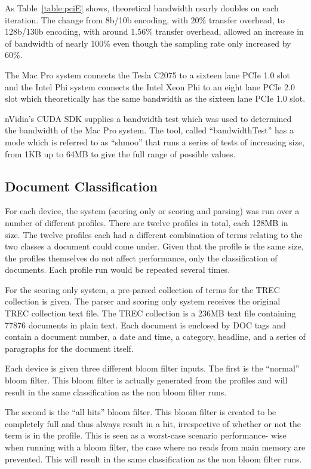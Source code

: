 As Table~\ref{table:pciE} shows, theoretical bandwidth nearly doubles on each
iteration. The change from 8b/10b encoding, with 20\% transfer overhead, to
128b/130b encoding, with around 1.56\% transfer overhead, allowed an increase in
of bandwidth of nearly 100\% even though the sampling rate only increased by
60\%.

The Mac Pro system connects the Tesla C2075 to a sixteen lane PCIe 1.0 slot and
the Intel Phi system connects the Intel Xeon Phi to an eight lane PCIe 2.0 slot
which theoretically has the same bandwidth as the sixteen lane PCIe 1.0 slot.

nVidia's CUDA SDK supplies a bandwidth test which was used to determined the
bandwidth of the Mac Pro system. The tool, called ``bandwidthTest'' has a mode
which is referred to as ``shmoo'' that runs a series of tests of increasing
size, from 1KB up to 64MB to give the full range of possible values.

\subsection{Document Classification}

For each device, the system (scoring only or scoring and parsing) was run over a
number of different profiles. There are twelve profiles in total, each 128MB in
size. The twelve profiles each had a different combination of terms relating to
the two classes a document could come under. Given that the profile is the same
size, the profiles themselves do not affect performance, only the classification
of documents. Each profile run would be repeated several times.

For the scoring only system, a pre-parsed collection of terms for the TREC
collection is given. The parser and scoring only system receives the original
TREC collection text file. The TREC collection is a 236MB text file containing
77876 documents in plain text. Each document is enclosed by DOC tags and
contain a document number, a date and time, a category, headline, and a series
of paragraphs for the document itself.

Each device is given three different bloom filter inputs. The first is the
``normal'' bloom filter. This bloom filter is actually generated from the
profiles and will result in the same classification as the non bloom filter
runs.

The second is the ``all hits'' bloom filter. This bloom filter is created to be
completely full and thus always result in a hit, irrespective of whether or not
the term is in the profile. This is seen as a worst-case scenario performance-
wise when running with a bloom filter, the case where no reads from main memory
are prevented. This will result in the same classification as the non bloom
filter runs.

